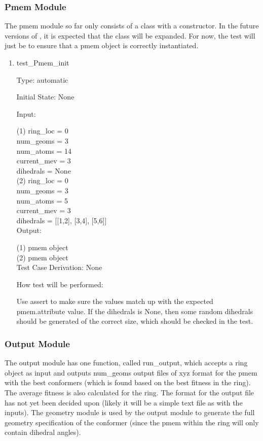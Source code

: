 \documentclass[12pt, titlepage]{article}
\begin{document}
\subsubsection{Pmem Module}

The pmem module so far only consists of a class with a constructor. In the 
future versions of \progname{}, it is expected that the class will be expanded. 
For now, the test will just be to ensure that a pmem object is correctly 
instantiated.

\begin{enumerate}
	
\item{test\_Pmem\_init\\}

Type: automatic

Initial State: None

Input:

(1)	
ring\_loc = 0 \\
num\_geoms = 3 \\
num\_atoms = 14 \\
current\_mev = 3 \\
dihedrals = None \\

(2)
ring\_loc = 0 \\
num\_geoms = 3 \\
num\_atoms = 5 \\
current\_mev = 3 \\
dihedrals = [[1,2], [3,4], [5,6]] \\

Output:

(1) pmem object \\
(2) pmem object \\

Test Case Derivation: None

How test will be performed:

Use assert to make sure the values match up with the expected pmem.attribute 
value. If the dihedrals is None, then some random dihedrals should be generated 
of the correct size, which should be checked in the test.
	
\end{enumerate}

\subsubsection{Output Module}

The output module has one function, called run\_output, which accepts a ring 
object as input and outputs num\_geoms output files of xyz format for the pmem 
with the best conformers (which is found based on the best fitness in the 
ring). The average fitness is also calculated for the ring. The format for the 
output file has not yet been decided upon (likely it will be a simple text file 
as with the inputs). The geometry module is used by the output module to 
generate the full geometry specification of the conformer (since the pmem 
within the ring will only contain dihedral angles).
\end{document}
